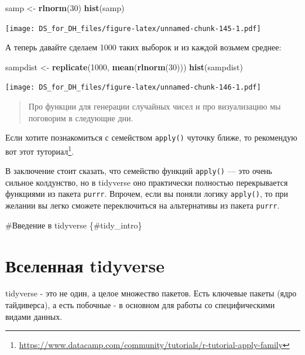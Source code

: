 \documentclass[
]{book}
\newenvironment{Shaded}{\begin{snugshade}}{\end{snugshade}}
\newcommand{\DecValTok}[1]{\textcolor[rgb]{0.00,0.00,0.81}{#1}}
\newcommand{\KeywordTok}[1]{\textcolor[rgb]{0.13,0.29,0.53}{\textbf{#1}}}
\newcommand{\NormalTok}[1]{#1}
\newcommand{\StringTok}[1]{\textcolor[rgb]{0.31,0.60,0.02}{#1}}
\renewcommand{\href}[2]{#2\footnote{\url{#1}}}
\begin{document}
\begin{Shaded}
\begin{Highlighting}[]
\NormalTok{samp <-}\StringTok{ }\KeywordTok{rlnorm}\NormalTok{(}\DecValTok{30}\NormalTok{)}
\KeywordTok{hist}\NormalTok{(samp)}
\end{Highlighting}
\end{Shaded}

\texttt{[image: DS\_for\_DH\_files/figure-latex/unnamed-chunk-145-1.pdf]}

А теперь давайте сделаем 1000 таких выборок и из каждой возьмем среднее:

\begin{Shaded}
\begin{Highlighting}[]
\NormalTok{sampdist <-}\StringTok{ }\KeywordTok{replicate}\NormalTok{(}\DecValTok{1000}\NormalTok{, }\KeywordTok{mean}\NormalTok{(}\KeywordTok{rlnorm}\NormalTok{(}\DecValTok{30}\NormalTok{)))}
\KeywordTok{hist}\NormalTok{(sampdist)}
\end{Highlighting}
\end{Shaded}

\texttt{[image: DS\_for\_DH\_files/figure-latex/unnamed-chunk-146-1.pdf]}

\begin{quote}
Про функции для генерации случайных чисел и про визуализацию мы поговорим в следующие дни.
\end{quote}

Если хотите познакомиться с семейством \texttt{apply()} чуточку ближе, то рекомендую \href{https://www.datacamp.com/community/tutorials/r-tutorial-apply-family}{вот этот туториал}.

В заключение стоит сказать, что семейство функций \texttt{apply()} --- это очень сильное колдунство, но в tidyverse оно практически полностью перекрывается функциями из пакета \texttt{purrr}. Впрочем, если вы поняли логику \texttt{apply()}, то при желании вы легко сможете переключиться на альтернативы из пакета \texttt{purrr}.

\#Введение в tidyverse \{\#tidy\_intro\}

\hypertarget{tidy_verse}{%
\section{Вселенная tidyverse}\label{tidy_verse}}

tidyverse - это не один, а целое множество пакетов. Есть ключевые пакеты (ядро тайдиверса), а есть побочные - в основном для работы со специфическими видами данных.
\end{document}

